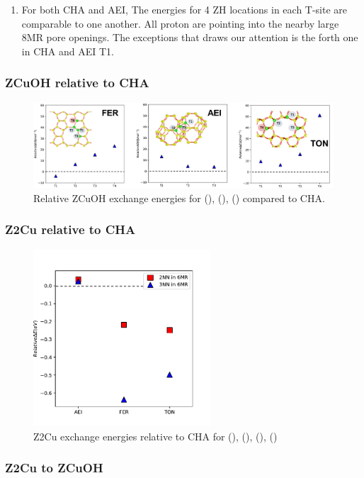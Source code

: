 \documentclass[12pt]{article}
\begin{document}
\begin{enumerate}[resume]
\item For both CHA and AEI, The energies for 4 ZH locations in each T-site are comparable to one another. All proton are pointing into the nearby large 8MR pore openings. The exceptions that draws our attention is the forth one in CHA and AEI T1. 
\end{enumerate}

\subsubsection*{ZCuOH relative to CHA}
\begin{figure}[H]
\centering
  \includegraphics[width=5.2in]{./Figures/Figure-3}
  \caption{Relative ZCuOH exchange energies  for (), (), () compared to CHA.}
  \label{ZH}
\end{figure}

\subsubsection*{Z2Cu relative to CHA}
\begin{figure}[H]
\centering
  \includegraphics[width=2.6in]{./Figures/Figure-4}
  \caption{Z2Cu exchange energies relative to CHA for (), (), (), ()}
  \label{PhaseDiagram}
\end{figure}

\subsubsection*{Z2Cu to ZCuOH}
\end{document}
